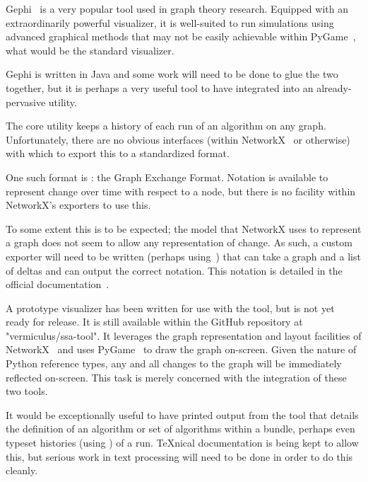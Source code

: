 \begin{task}
  \label{task:gephi-glue}
  Gephi~\autocite{gephi} is a very popular tool used in graph theory research.
  Equipped with an extraordinarily powerful visualizer,
    it is well-suited to run simulations using advanced graphical methods
    that may not be easily achievable within PyGame~\autocite{pygame},
    what would be the standard visualizer.
  
  Gephi is written in Java and some work will need to be done
    to glue the two together, but it is perhaps a very useful tool to have
    integrated into an already-pervasive utility.
\end{task}

\begin{task}
  \label{task:anigexf}
  The core utility keeps a history of each run of an algorithm on any graph.
  Unfortunately, there are no obvious interfaces
    (within NetworkX~\autocite{hagberg:networkx} or otherwise)
    with which to export this to a standardized format.

  One such format is : the Graph Exchange Format.
  Notation is available to represent change over time with respect to a node,
    but there is no facility within NetworkX's exporters to use this.

  To some extent this is to be expected; the model that NetworkX uses to represent a graph
    does not seem to allow any representation of change.
  As such, a custom exporter will need to be written (perhaps using~\autocite{pygexf}) that
    can take a graph and a list of deltas and can output the correct notation.
  This notation is detailed in the official documentation~\autocite{gexf}.
\end{task}

\begin{task}
  \label{task:gui-visualizer}
  A prototype visualizer has been written for use with the tool,
    but is not yet ready for release.
  It is still available within the GitHub repository at "vermiculus/ssa-tool".
  It leverages the graph representation and layout facilities of NetworkX~\autocite{hagberg:networkx}
    and uses PyGame~\autocite{pygame} to draw the graph on-screen.
  Given the nature of Python reference types, any and all changes to the graph
    will be immediately reflected on-screen.
  This task is merely concerned with the integration of these two tools.
\end{task}

\begin{task}
  \label{task:texport}
  It would be exceptionally useful to have printed output from the
  tool that details the definition of an algorithm or set of
  algorithms within a bundle, perhaps even typeset histories (using
  \TikZ) of a run.  \TeX nical documentation is being kept to allow
  this, but serious work in text processing will need to be done in
  order to do this cleanly.
\end{task}

